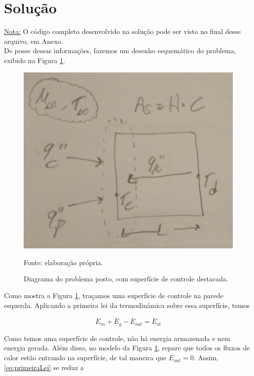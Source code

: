 \documentclass[12pt]{scrartcl}
\begin{document}
\section{Solução}

\underline{Nota:} O código completo desenvolvido na solução pode ser visto no final desse arquivo, em Anexo. \\

De posse dessas informações, fazemos um desenho esquemático do problema, exibido na
Figura \ref{fig:problemaParede}.

\begin{figure}[h!]
    \caption{Diagrama do problema posto, com superfície de controle destacada.}
    \label{fig:problemaParede}
    \centering
    \includegraphics[scale=0.18]{esquematico.jpeg}
    \par{Fonte: elaboração própria.}
\end{figure}

Como mostra a Figura \ref{fig:problemaParede}, traçamos uma superfície de controle na
parede esquerda. Aplicando a primeira lei da termodinâmica sobre essa superfície, temos

\begin{equation}\label{eq:primeiraLei}
    \overset{\cdot}{E}_{in} + \overset{\cdot}{E}_{g} - \overset{\cdot}{E}_{out} = \overset{\cdot}{E}_{st}
\end{equation}

Como temos uma superfície de controle, não há energia armazenada e nem energia gerada. Além disso, no modelo
da Figura \ref*{fig:problemaParede}, repare que todos os fluxos de calor estão entrando na superfície, de tal
maneira que $\overset{\cdot}{E}_{out} = 0$. Assim, \eqref{eq:primeiraLei} se reduz a
\end{document}
